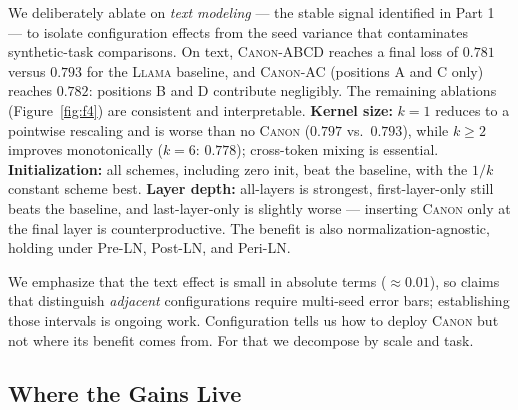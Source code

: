 \documentclass{article}
\newcommand{\Canon}{\textsc{Canon}\xspace}
\newcommand{\Llama}{\textsc{Llama}\xspace}
\begin{document}
We deliberately ablate on \emph{text modeling} --- the stable signal identified in Part 1 ---
to isolate configuration effects from the seed variance that contaminates synthetic-task
comparisons. On text, \Canon-ABCD reaches a final loss of $0.781$ versus $0.793$ for the \Llama
baseline, and \Canon-AC (positions A and C only) reaches $0.782$: positions B and D contribute
negligibly. The remaining ablations (Figure~\ref{fig:f4}) are consistent and interpretable.
\textbf{Kernel size:} $k=1$ reduces to a pointwise rescaling and is worse than no \Canon
($0.797$ vs.\ $0.793$), while $k\ge2$ improves monotonically ($k{=}6$: $0.778$); cross-token
mixing is essential. \textbf{Initialization:} all schemes, including zero init, beat the
baseline, with the $1/k$ constant scheme best. \textbf{Layer depth:} all-layers is strongest,
first-layer-only still beats the baseline, and last-layer-only is slightly worse --- inserting
\Canon only at the final layer is counterproductive. The benefit is also normalization-agnostic,
holding under Pre-LN, Post-LN, and Peri-LN.

We emphasize that the text effect is small in absolute terms ($\approx0.01$), so claims that
distinguish \emph{adjacent} configurations require multi-seed error bars; establishing those
intervals is ongoing work. Configuration tells us how to deploy \Canon but not where its benefit
comes from. For that we decompose by scale and task.

\subsection{Where the Gains Live}
\label{sec:p2:where}
\end{document}
